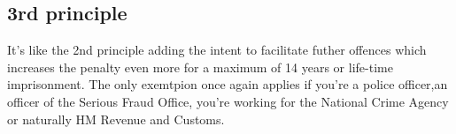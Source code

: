 \documentclass[a4paper,12pt]{article}
\begin{document}
 
\subsection{3rd principle}
It's like the 2nd principle adding the intent to facilitate futher offences which increases the penalty even more for a maximum of 14 years or life-time imprisonment. The only exemtpion once again applies if you're a police officer,an officer of the Serious Fraud Office, you're working for the National Crime Agency or naturally HM Revenue and Customs.

\clearpage

\printindex
\end{document}
